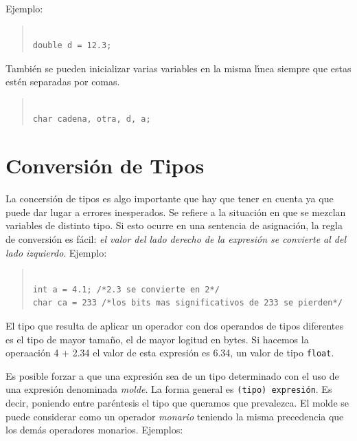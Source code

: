 Ejemplo:

\begin{quotation}
\begin{verbatim}

double d = 12.3;

\end{verbatim}
\end{quotation}

Tambi\'en se pueden inicializar varias variables en la misma l\'{\i}nea
siempre que estas est\'en separadas por comas.

\begin{quotation}
\begin{verbatim}

char cadena, otra, d, a;

\end{verbatim}
\end{quotation}

\section{Conversi\'on de Tipos}


La concersi\'on de tipos es algo importante que hay que tener en cuenta ya que
puede dar lugar a errores inesperados. Se refiere a la situaci\'on en que se
 mezclan variables de distinto tipo. Si esto ocurre en una  sentencia de 
asignaci\'on, la regla de conversi\'on es f\'acil: \emph{el valor del lado
derecho de la expresi\'on se convierte al del lado izquierdo}. Ejemplo:

\begin{quotation}
\begin{verbatim}

int a = 4.1; /*2.3 se convierte en 2*/
char ca = 233 /*los bits mas significativos de 233 se pierden*/

\end{verbatim}
\end{quotation}

El tipo que resulta de aplicar un operador con dos operandos de tipos
 diferentes es el tipo de mayor tama\~no, el de mayor logitud en bytes. 
Si hacemos la operaaci\'on 4 + 2.34 el valor de esta expresi\'on es 6.34,
un valor de tipo \texttt{float}.

Es posible forzar a que una expresi\'on sea de un tipo determinado con el uso
de una expresi\'on denominada \emph{molde}. La forma general es 
\texttt{(tipo) expresi\'on}. Es decir, poniendo entre par\'entesis el tipo
que queramos que prevalezca. El molde se puede considerar como un operador
\emph{monario} teniendo la misma precedencia que los dem\'as operadores 
monarios. Ejemplos:

